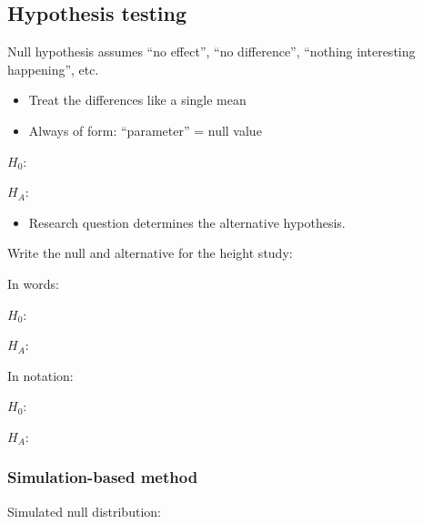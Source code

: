 \documentclass[
]{report}
\providecommand{\tightlist}{%
  \setlength{\itemsep}{0pt}\setlength{\parskip}{0pt}}
\begin{document}
\newpage

\hypertarget{hypothesis-testing-3}{%
\subsection*{Hypothesis testing}\label{hypothesis-testing-3}}

Null hypothesis assumes ``no effect'', ``no difference'', ``nothing interesting happening'', etc.

\begin{itemize}
\item
  Treat the differences like a single mean
\item
  Always of form: ``parameter'' = null value
\end{itemize}

\(H_0:\)

\vspace{0.2in}

\(H_A:\)

\vspace{0.2in}

\begin{itemize}
\tightlist
\item
  Research question determines the alternative hypothesis.
\end{itemize}

Write the null and alternative for the height study:

In words:

\(H_0:\)

\vspace{0.5in}

\(H_A:\)

\vspace{0.5in}

In notation:

\(H_0:\)

\vspace{0.2in}

\(H_A:\)

\vspace{0.2in}

\hypertarget{simulation-based-method-4}{%
\subsubsection*{Simulation-based method}\label{simulation-based-method-4}}

Simulated null distribution:
\end{document}
